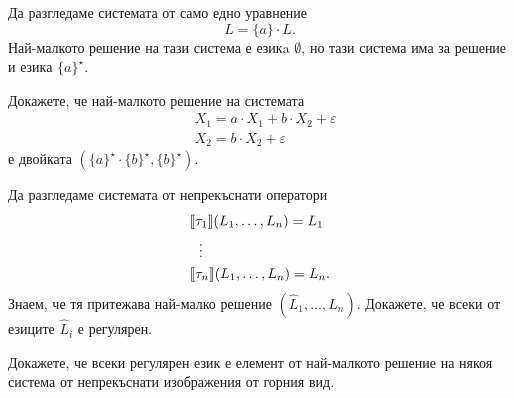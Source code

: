 \begin{example}
  Да разгледаме системата от само едно уравнение
  \[L = \{a\} \cdot L.\]
  Най-малкото решение на тази система е езикa $\emptyset$,
  но тази система има за решение и езика $\{a\}^\star$.
\end{example}

  
\begin{problem}
  Докажете, че най-малкото решение на системата 
  \begin{align*}
    & X_1 = a \cdot X_1 + b \cdot X_2 + \varepsilon\\
    & X_2 = b \cdot X_2 + \varepsilon
  \end{align*}
  е двойката $(\{a\}^\star \cdot \{b\}^\star, \{b\}^\star)$.
  
\end{problem}

\begin{problem}
  Да разгледаме системата от непрекъснати оператори
  \begin{align*}
    & \llbracket{\tau_1}\rrbracket(L_1,\dots,L_n) = L_1\\
    & \ \ \vdots\\
    & \llbracket{\tau_n}\rrbracket(L_1,\dots,L_n) = L_n.
  \end{align*}
  Знаем, че тя притежава най-малко решение $(\hat{L}_1,\dots,\hat{L}_n)$.
  Докажете, че всеки от езиците $\hat{L}_i$ е регулярен.

  Докажете, че всеки регулярен език е елемент от най-малкото решение 
  на някоя система от непрекъснати изображения от горния вид.
\end{problem}




